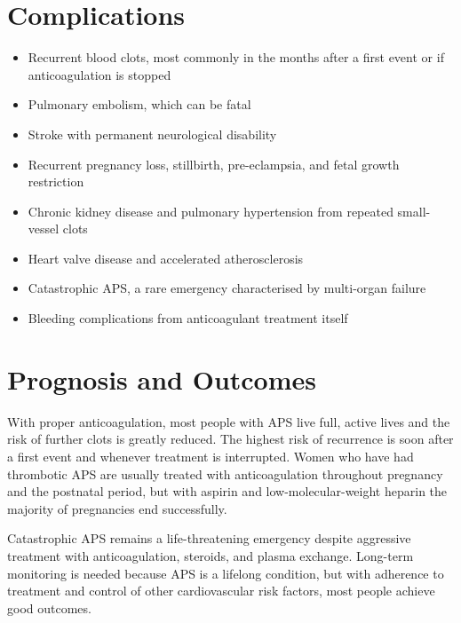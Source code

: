 \section*{Complications}
\begin{itemize}
    \item Recurrent blood clots, most commonly in the months after a first event or if anticoagulation is stopped
    \item Pulmonary embolism, which can be fatal
    \item Stroke with permanent neurological disability
    \item Recurrent pregnancy loss, stillbirth, pre-eclampsia, and fetal growth restriction
    \item Chronic kidney disease and pulmonary hypertension from repeated small-vessel clots
    \item Heart valve disease and accelerated atherosclerosis
    \item Catastrophic APS, a rare emergency characterised by multi-organ failure
    \item Bleeding complications from anticoagulant treatment itself
\end{itemize}

\section*{Prognosis and Outcomes}
With proper anticoagulation, most people with APS live full, active lives and the risk of further clots is greatly reduced. The highest risk of recurrence is soon after a first event and whenever treatment is interrupted. Women who have had thrombotic APS are usually treated with anticoagulation throughout pregnancy and the postnatal period, but with aspirin and low-molecular-weight heparin the majority of pregnancies end successfully.

Catastrophic APS remains a life-threatening emergency despite aggressive treatment with anticoagulation, steroids, and plasma exchange. Long-term monitoring is needed because APS is a lifelong condition, but with adherence to treatment and control of other cardiovascular risk factors, most people achieve good outcomes.

